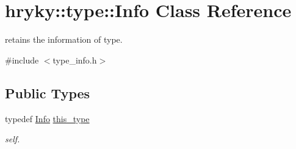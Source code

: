 \hypertarget{classhryky_1_1type_1_1_info}{\section{hryky\-:\-:type\-:\-:Info Class Reference}
\label{classhryky_1_1type_1_1_info}
}


retains the information of type.  




{\ttfamily \#include $<$type\-\_\-info.\-h$>$}

\subsection*{Public Types}
\begin{DoxyCompactItemize}
\item 
\hypertarget{classhryky_1_1type_1_1_info_add4519e2ccc4c1ea0266694bc15135b7}{typedef \hyperlink{classhryky_1_1type_1_1_info}{Info} \hyperlink{classhryky_1_1type_1_1_info_add4519e2ccc4c1ea0266694bc15135b7}{this\-\_\-type}}\label{classhryky_1_1type_1_1_info_add4519e2ccc4c1ea0266694bc15135b7}

\begin{DoxyCompactList}\small\item\em self. \end{DoxyCompactList}\end{DoxyCompactItemize}
